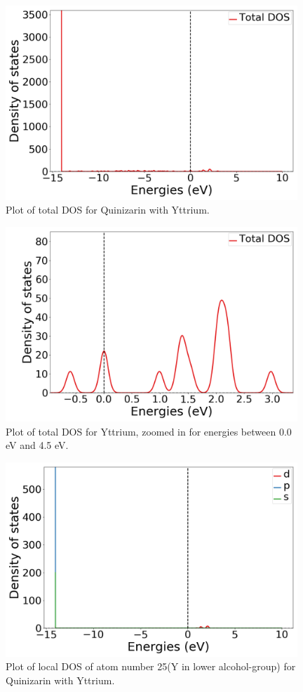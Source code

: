 \documentclass{article}
\begin{document}
  \begin{figure}[H]
      \centering
      \includegraphics[width = 11cm]{../fig/Y_TDOS_1.png}
      \caption{Plot of total DOS for Quinizarin with Yttrium. }
      \label{fig:Y_TDOS_1.png}
  \end{figure}

  \begin{figure}[H]
      \centering
      \includegraphics[width = 11cm]{../fig/Y_TDOS_2.png}
      \caption{Plot of total DOS for Yttrium, zoomed in for energies between 0.0 eV and 4.5 eV. }
      \label{fig:Y_TDOS_2.png}
  \end{figure}

  \begin{figure}[H]
      \centering
      \includegraphics[width = 11cm]{../fig/Y_LDOS25_1.png}
      \caption{Plot of local DOS of atom number 25(Y in lower alcohol-group) for Quinizarin with Yttrium. }
      \label{fig:Y_LDOS25_1.png}
  \end{figure}
\end{document}
